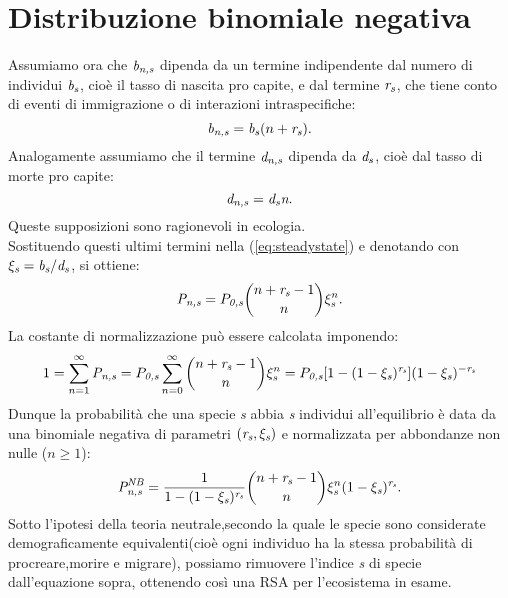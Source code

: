 \section{Distribuzione binomiale negativa}

Assumiamo ora che $\emph{b}_\emph{{n,s}}$ dipenda da un termine indipendente dal numero di individui $\emph{b}_\emph{s}$, cioè il tasso di nascita pro capite, e dal termine $\emph{r}_\emph{s}$, che tiene conto di eventi di immigrazione o di interazioni intraspecifiche:
\begin{equation}
\emph{b}_\emph{n,s}=\emph{b}_\emph{s}(n+\emph{r}_\emph{s}).
\label{eq:birthNB}
\end{equation}
Analogamente assumiamo che il termine $\emph{d}_\emph{n,s}$ dipenda da $\emph{d}_\emph{s}$, cioè dal tasso di morte pro capite:
\begin{equation}
\emph{d}_\emph{n,s}=\emph{d}_\emph{s}\emph{n}.
\label{eq:deathNB}
\end{equation}
Queste supposizioni sono ragionevoli in ecologia.\\
Sostituendo questi ultimi termini nella (\ref{eq:steadystate}) e denotando con $\xi_\emph{s}=\emph{b}_\emph{s}/\emph{d}_\emph{s}$, si ottiene:
$$
\emph{P}_\emph{n,s}=P_\emph{0,s}\binom{n+\emph{r}_\emph{s}-1}{n}\xi_\emph{s}^n.
$$
La costante di normalizzazione può essere calcolata imponendo:
$$
1=\sum_{n=1}^\infty \emph{P}_{\emph{n,s}}=P_\emph{0,s}\sum_{n=0}^\infty\binom{n+\emph{r}_\emph{s}-1}{n}\xi_\emph{s}^n=P_\emph{0,s}[1-(1-\xi_\emph{s})^{\emph{r}_\emph{s}}](1-\xi_\emph{s})^{-\emph{r}_\emph{s}}
$$
Dunque la probabilità che una specie \emph{s} abbia \emph{s} individui all'equilibrio è data da una binomiale negativa di parametri $(\emph{r}_\emph{s}, \xi_\emph{s})$ e normalizzata per abbondanze non nulle ($n\ge 1$):
\begin{equation}
\emph{P}_\emph{n,s}^{\emph{NB}}=\frac{1}{1-(1-\xi_\emph{s})^{\emph{r}_\emph{s}}}\binom{n+\emph{r}_\emph{s}-1}{n}\xi_\emph{s}^n(1-\xi_\emph{s})^{\emph{r}_\emph{s}}.
\label{eq:NBprobability}
\end{equation}
Sotto l'ipotesi della teoria neutrale,secondo la quale le specie sono considerate demograficamente equivalenti(cioè ogni individuo ha la stessa probabilità di procreare,morire e migrare), possiamo rimuovere l'indice \emph{s} di specie dall'equazione sopra, ottenendo così una RSA per l'ecosistema in esame.

